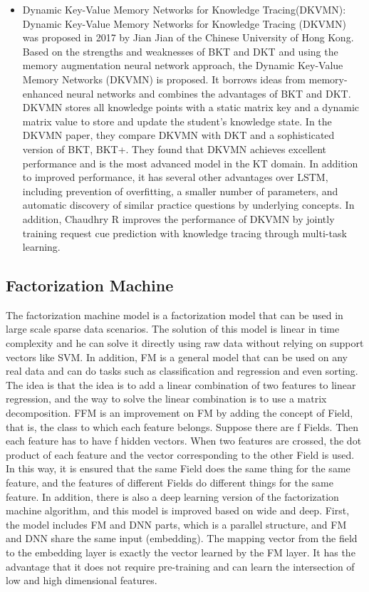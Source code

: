 \begin{itemize}
	\item Dynamic Key-Value Memory Networks for Knowledge Tracing(DKVMN): Dynamic Key-Value Memory Networks for Knowledge Tracing (DKVMN) was proposed in 2017 by Jian Jian of the Chinese University of Hong Kong\cite{zhang2017dynamic}. Based on the strengths and weaknesses of BKT and DKT and using the memory augmentation neural network approach, the Dynamic Key-Value Memory Networks (DKVMN) is proposed. It borrows ideas from memory-enhanced neural networks and combines the advantages of BKT and DKT. DKVMN stores all knowledge points with a static matrix key and a dynamic matrix value to store and update the student's knowledge state. In the DKVMN paper, they compare DKVMN with DKT and a sophisticated version of BKT, BKT+. They found that DKVMN achieves excellent performance and is the most advanced model in the KT domain. In addition to improved performance, it has several other advantages over LSTM, including prevention of overfitting, a smaller number of parameters, and automatic discovery of similar practice questions by underlying concepts. In addition, Chaudhry R\cite{chaudhry2018modeling} improves the performance of DKVMN by jointly training request cue prediction with knowledge tracing through multi-task learning.
\end{itemize}

\subsection{Factorization Machine}
The factorization machine model is a factorization model that can be used in large scale sparse data scenarios\cite{rendle2010factorization}. The solution of this model is linear in time complexity and he can solve it directly using raw data without relying on support vectors like SVM. In addition, FM is a general model that can be used on any real data and can do tasks such as classification and regression and even sorting. The idea is that the idea is to add a linear combination of two features to linear regression, and the way to solve the linear combination is to use a matrix decomposition. FFM is an improvement on FM by adding the concept of Field\cite{juan2016field}, that is, the class to which each feature belongs. Suppose there are f Fields. Then each feature has to have f hidden vectors. When two features are crossed, the dot product of each feature and the vector corresponding to the other Field is used. In this way, it is ensured that the same Field does the same thing for the same feature, and the features of different Fields do different things for the same feature. In addition, there is also a deep learning version of the factorization machine algorithm\cite{guo2017deepfm}, and this model is improved based on wide and deep. First, the model includes FM and DNN parts, which is a parallel structure, and FM and DNN share the same input (embedding). The mapping vector from the field to the embedding layer is exactly the vector learned by the FM layer. It has the advantage that it does not require pre-training and can learn the intersection of low and high dimensional features.


